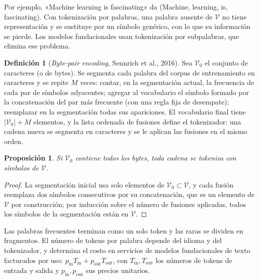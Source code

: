 \documentclass[11pt,a4paper]{article}
\theoremstyle{plain}
\newtheorem{proposicion}[teorema]{Proposición}
\theoremstyle{definition}
\newtheorem{definicion}[teorema]{Definición}
\theoremstyle{remark}
\newcommand{\1}{\mathbf{1}}
\begin{document}
Por ejemplo, «Machine learning is fascinating» da
(Machine, learning, is, fascinating). Con tokenización por palabras, una
palabra ausente de $\mathcal V$ no tiene representación y se sustituye por
un símbolo genérico, con lo que su información se pierde. Los modelos
fundacionales usan tokenización por subpalabras, que elimina ese problema.

\begin{definicion}[\emph{Byte-pair encoding}, Sennrich et al., 2016]
Sea $\mathcal V_0$ el conjunto de caracteres (o de bytes). Se segmenta cada
palabra del corpus de entrenamiento en caracteres y se repite $M$ veces:
contar, en la segmentación actual, la frecuencia de cada par de símbolos
adyacentes; agregar al vocabulario el símbolo formado por la concatenación
del par más frecuente (con una regla fija de desempate); reemplazar en la
segmentación todas sus apariciones. El vocabulario final tiene
$|\mathcal V_0|+M$ elementos, y la lista ordenada de fusiones define el
tokenizador: una cadena nueva se segmenta en caracteres y se le aplican
las fusiones en el mismo orden.
\end{definicion}

\begin{proposicion}
Si $\mathcal V_0$ contiene todos los bytes, toda cadena se tokeniza con
símbolos de $\mathcal V$.
\end{proposicion}

\begin{proof}
La segmentación inicial usa solo elementos de $\mathcal V_0\subset\mathcal
V$, y cada fusión reemplaza dos símbolos consecutivos por su
concatenación, que es un elemento de $\mathcal V$ por construcción; por
inducción sobre el número de fusiones aplicadas, todos los símbolos de la
segmentación están en $\mathcal V$.
\end{proof}

Las palabras frecuentes terminan como un solo token y las raras se
dividen en fragmentos. El número de tokens por palabra depende del idioma
y del tokenizador, y determina el costo en servicios de modelos
fundacionales de texto facturados por uso: $p_{\mathrm{in}}T_{\mathrm{in}}+p_{\mathrm{out}}T_{\mathrm{out}}$,
con $T_{\mathrm{in}},T_{\mathrm{out}}$ los números de tokens de entrada y
salida y $p_{\mathrm{in}},p_{\mathrm{out}}$ sus precios unitarios.
\end{document}
